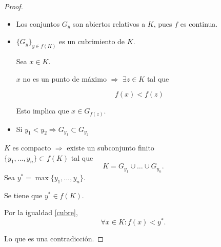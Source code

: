 \documentclass[a4,portrait]{seminar}
\begin{document}
\begin{slide*}
\begin{proof}
\begin{itemize}
    \item[\ding{226}]
        Los conjuntos $G_y$ son abiertos relativos a $K$, pues $f$ es continua.
    \item[\ding{226}]
         $\{G_y\}_{y\in f(K)}$ es un cubrimiento de
        $K$.

        Sea $x\in K$.

         $x$ no es un punto de m\'aximo $\Rightarrow$
         $\exists z\in K$ tal que

         \[
          f(x)<f(z)
         \]

         Esto implica que $x\in G_{f(z)}$.

    \item[\ding{226}]
        Si $y_1<y_2\Rightarrow G_{y_1}\subset G_{y_2}$
\end{itemize}

 $K$ es compacto $\Rightarrow$ existe un subconjunto finito\\
$\{y_1,...,y_n\}\subset f(K)$ tal que
\begin{equation}\label{cubre}
    K=G_{y_1}\cup\dots\cup G_{y_n}.
\end{equation}
Sea $y^*=\max\{y_1,...,y_n\}$.

 Se tiene que $y^*\in f(K)$.

 Por la igualdad \eqref{cubre},
 \[
    \forall x\in K: f(x)<y^*.
 \]

Lo que es una contradicci\'on.
\end{proof}


\end{slide*}
\end{document}
